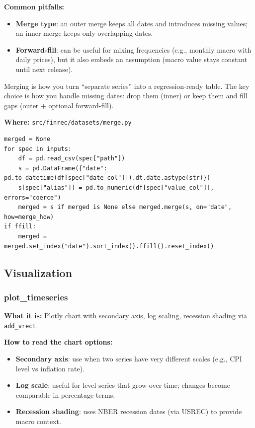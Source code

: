 \documentclass[11pt,a4paper]{article}
\begin{document}
\textbf{Common pitfalls:}
\begin{itemize}[leftmargin=2em]
  \item \textbf{Merge type}: an outer merge keeps all dates and introduces missing values; an inner merge keeps only overlapping dates.
  \item \textbf{Forward-fill}: can be useful for mixing frequencies (e.g., monthly macro with daily prices), but it also embeds an assumption (macro value stays constant until next release).
\end{itemize}

\begin{intuitionbox}
Merging is how you turn ``separate series'' into a regression-ready table. The key choice is how you handle missing dates: drop them (inner) or keep them and fill gaps (outer + optional forward-fill).
\end{intuitionbox}

\textbf{Where:} \texttt{src/finrec/datasets/merge.py}

\begin{lstlisting}
merged = None
for spec in inputs:
    df = pd.read_csv(spec["path"])
    s = pd.DataFrame({"date": pd.to_datetime(df[spec["date_col"]]).dt.date.astype(str)})
    s[spec["alias"]] = pd.to_numeric(df[spec["value_col"]], errors="coerce")
    merged = s if merged is None else merged.merge(s, on="date", how=merge_how)
if ffill:
    merged = merged.set_index("date").sort_index().ffill().reset_index()
\end{lstlisting}

\subsection{Visualization}

\subsubsection{plot\_timeseries}\label{sec:plot}

\textbf{What it is:} Plotly chart with secondary axis, log scaling, recession shading via \texttt{add\_vrect}.

\textbf{How to read the chart options:}
\begin{itemize}[leftmargin=2em]
  \item \textbf{Secondary axis}: use when two series have very different scales (e.g., CPI level vs inflation rate).
  \item \textbf{Log scale}: useful for level series that grow over time; changes become comparable in percentage terms.
  \item \textbf{Recession shading}: uses NBER recession dates (via USREC) to provide macro context.
\end{itemize}
\end{document}
